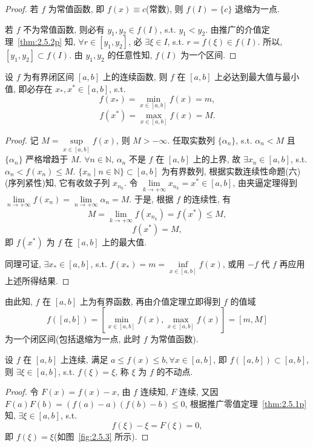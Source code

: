 \begin{proof}
若 $f$ 为常值函数, 即 $f(x) \equiv c$(常数), 则 $f(I) = \{c\}$ 退缩为一点.

若 $f$ 不为常值函数, 则必有 $y_1, y_2 \in f(I)$, s.t. $y_1 < y_2$. 由推广的介值定理~\ref{thm:2.5.2p} 知, $\forall r \in [y_1, y_2]$, 必 $\exists \xi \in I$, s.t. $r = f(\xi) \in f(I)$. 所以, $[y_1, y_2] \subset f(I)$. 由 $y_1, y_2$ 的任意性知, $f(I)$ 为一个区间.
\end{proof}

\begin{theorem}[最值定理]\label{thm:2.5.3}
设 $f$ 为有界闭区间 $[a,b]$ 上的连续函数, 则 $f$ 在 $[a,b]$ 上必达到最大值与最小值, 即必存在 $x_*, x^* \in [a,b]$, s.t.
\[
f(x_*) = \min_{x \in [a,b]} f(x) = m,
\]
\[
f(x^*) = \max_{x \in [a,b]} f(x) = M.
\]
\end{theorem}

\begin{proof}
记 $M = \sup\limits_{x \in [a,b]} f(x)$, 则 $M > -\infty$. 任取实数列 $\{\alpha_n\}$, s.t. $\alpha_n < M$ 且 $\{\alpha_n\}$ 严格增趋于 $M$. $\forall n \in \mathbb{N}$, $\alpha_n$ 不是 $f$ 在 $[a,b]$ 上的上界, 故 $\exists x_n \in [a,b]$, s.t. $\alpha_n < f(x_n) \leqslant M$. $\{x_n \mid n \in \mathbb{N}\} \subset [a,b]$ 为有界数列, 根据实数连续性命题(六)(序列紧性)知, 它有收敛子列 $x_{n_k}$. 令 $\lim\limits_{k \to +\infty} x_{n_k} = x^* \in [a,b]$, 由夹逼定理得到 $\lim\limits_{n \to +\infty} f(x_n) = \lim\limits_{n \to +\infty} \alpha_n = M$. 于是, 根据 $f$ 的连续性, 有
\[
M = \lim_{k \to +\infty} f(x_{n_k}) = f(x^*) \leqslant M,
\]
\[
f(x^*) = M,
\]
即 $f(x^*)$ 为 $f$ 在 $[a,b]$ 上的最大值.

同理可证, $\exists x_* \in [a,b]$, s.t. $f(x_*) = m = \inf\limits_{x \in [a,b]} f(x)$, 或用 $-f$ 代 $f$ 再应用上述所得结果.
\end{proof}

由此知, $f$ 在 $[a,b]$ 上为有界函数, 再由介值定理立即得到 $f$ 的值域
\[
f([a,b]) = \left[\min_{x \in [a,b]} f(x), \max_{x \in [a,b]} f(x)\right] = [m, M]
\]
为一个闭区间(包括退缩为一点, 此时 $f$ 为常值函数).

\begin{example}\label{ex:2.5.1}
设 $f$ 在 $[a,b]$ 上连续, 满足 $a \leqslant f(x) \leqslant b, \forall x \in [a,b]$, 即 $f([a,b]) \subset [a,b]$, 则 $\exists \xi \in [a,b]$, s.t. $f(\xi) = \xi$, 称 $\xi$ 为 $f$ 的不动点.
\end{example}

\begin{proof}
令 $F(x) = f(x) - x$, 由 $f$ 连续知, $F$ 连续, 又因 $F(a)F(b) = (f(a) - a)(f(b) - b) \leqslant 0$, 根据推广零值定理~\ref{thm:2.5.1p} 知, $\exists \xi \in [a,b]$, s.t.
\[
f(\xi) - \xi = F(\xi) = 0,
\]
即 $f(\xi) = \xi$(如图~\ref{fig:2.5.3} 所示).
\end{proof}

